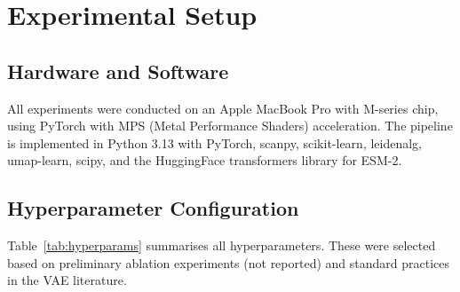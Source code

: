 \documentclass[11pt,a4paper]{article}
\begin{document}
\section{Experimental Setup}\label{sec:experiments}

\subsection{Hardware and Software}

All experiments were conducted on an Apple MacBook Pro with M-series chip, using PyTorch with MPS (Metal Performance Shaders) acceleration.
The pipeline is implemented in Python 3.13 with PyTorch, scanpy, scikit-learn, leidenalg, umap-learn, scipy, and the HuggingFace transformers library for ESM-2.

\subsection{Hyperparameter Configuration}

Table~\ref{tab:hyperparams} summarises all hyperparameters.
These were selected based on preliminary ablation experiments (not reported) and standard practices in the VAE literature.
\end{document}
